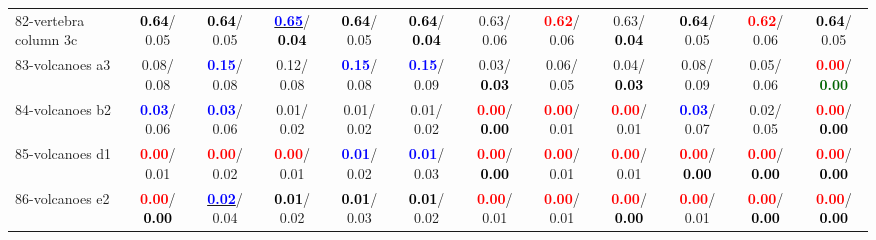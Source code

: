 \begin{table}[h]
\begin{center}
{\begin{tabular}{lc|c|c|c|c|c|c|c|c|c|c}
82-vertebra column 3c & \textcolor{black}{\textbf{  0.64}}/  0.05 & \textcolor{black}{\textbf{  0.64}}/  0.05 & \underline{\textcolor{blue}{\textbf{  0.65}}}/\textcolor{black}{\textbf{  0.04}} & \textcolor{black}{\textbf{  0.64}}/  0.05 & \textcolor{black}{\textbf{  0.64}}/\textcolor{black}{\textbf{  0.04}} &   0.63/  0.06 & \textcolor{red}{\textbf{  0.62}}/  0.06 &   0.63/\textcolor{black}{\textbf{  0.04}} & \textcolor{black}{\textbf{  0.64}}/  0.05 & \textcolor{red}{\textbf{  0.62}}/  0.06 & \textcolor{black}{\textbf{  0.64}}/  0.05 \\
83-volcanoes a3 &   0.08/  0.08 & \textcolor{blue}{\textbf{  0.15}}/  0.08 &   0.12/  0.08 & \textcolor{blue}{\textbf{  0.15}}/  0.08 & \textcolor{blue}{\textbf{  0.15}}/  0.09 &   0.03/\textcolor{black}{\textbf{  0.03}} &   0.06/  0.05 &   0.04/\textcolor{black}{\textbf{  0.03}} &   0.08/  0.09 &   0.05/  0.06 & \textcolor{red}{\textbf{  0.00}}/\textcolor{darkgreen}{\textbf{  0.00}} \\
84-volcanoes b2 & \textcolor{blue}{\textbf{  0.03}}/  0.06 & \textcolor{blue}{\textbf{  0.03}}/  0.06 &   0.01/  0.02 &   0.01/  0.02 &   0.01/  0.02 & \textcolor{red}{\textbf{  0.00}}/\textcolor{black}{\textbf{  0.00}} & \textcolor{red}{\textbf{  0.00}}/  0.01 & \textcolor{red}{\textbf{  0.00}}/  0.01 & \textcolor{blue}{\textbf{  0.03}}/  0.07 &   0.02/  0.05 & \textcolor{red}{\textbf{  0.00}}/\textcolor{black}{\textbf{  0.00}} \\
85-volcanoes d1 & \textcolor{red}{\textbf{  0.00}}/  0.01 & \textcolor{red}{\textbf{  0.00}}/  0.02 & \textcolor{red}{\textbf{  0.00}}/  0.01 & \textcolor{blue}{\textbf{  0.01}}/  0.02 & \textcolor{blue}{\textbf{  0.01}}/  0.03 & \textcolor{red}{\textbf{  0.00}}/\textcolor{black}{\textbf{  0.00}} & \textcolor{red}{\textbf{  0.00}}/  0.01 & \textcolor{red}{\textbf{  0.00}}/  0.01 & \textcolor{red}{\textbf{  0.00}}/\textcolor{black}{\textbf{  0.00}} & \textcolor{red}{\textbf{  0.00}}/\textcolor{black}{\textbf{  0.00}} & \textcolor{red}{\textbf{  0.00}}/\textcolor{black}{\textbf{  0.00}} \\ \hline
86-volcanoes e2 & \textcolor{red}{\textbf{  0.00}}/\textcolor{black}{\textbf{  0.00}} & \underline{\textcolor{blue}{\textbf{  0.02}}}/  0.04 & \textcolor{black}{\textbf{  0.01}}/  0.02 & \textcolor{black}{\textbf{  0.01}}/  0.03 & \textcolor{black}{\textbf{  0.01}}/  0.02 & \textcolor{red}{\textbf{  0.00}}/  0.01 & \textcolor{red}{\textbf{  0.00}}/  0.01 & \textcolor{red}{\textbf{  0.00}}/\textcolor{black}{\textbf{  0.00}} & \textcolor{red}{\textbf{  0.00}}/  0.01 & \textcolor{red}{\textbf{  0.00}}/\textcolor{black}{\textbf{  0.00}} & \textcolor{red}{\textbf{  0.00}}/\textcolor{black}{\textbf{  0.00}} \\

\end{tabular}}
\end{center}
\end{table}
